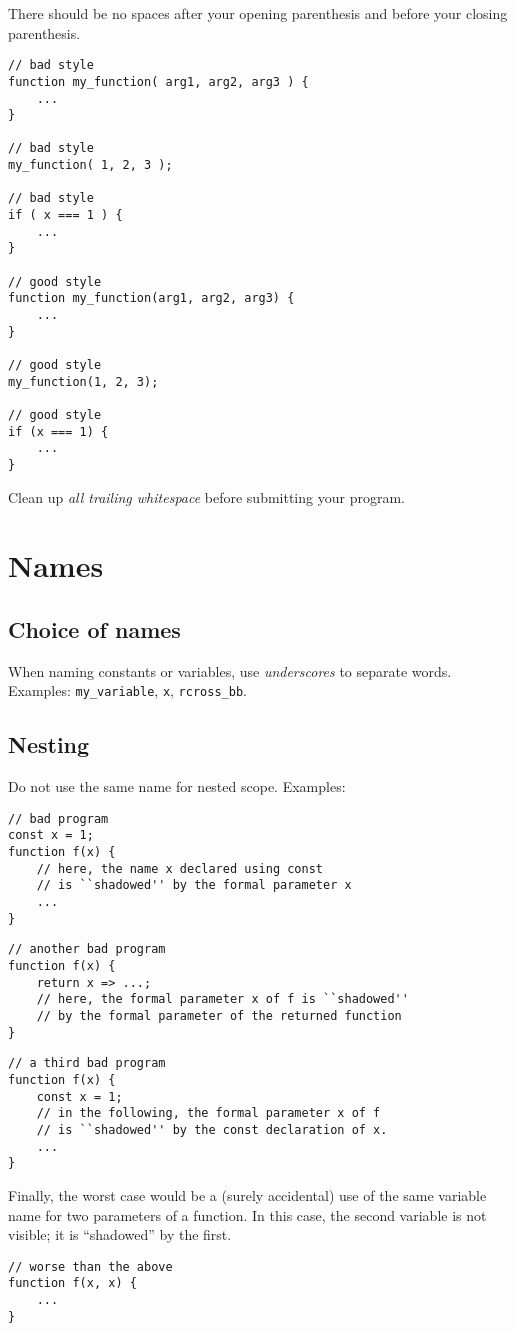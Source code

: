   There should be no spaces after your opening parenthesis and before your closing parenthesis.
  
\begin{lstlisting}
// bad style
function my_function( arg1, arg2, arg3 ) {
    ...
}

// bad style
my_function( 1, 2, 3 );

// bad style
if ( x === 1 ) {
    ...
}

// good style
function my_function(arg1, arg2, arg3) {
    ...
}

// good style
my_function(1, 2, 3);

// good style
if (x === 1) {
    ...
}
\end{lstlisting}

  Clean up \emph{all trailing whitespace} before submitting your program.

\section*{Names}
\subsection*{Choice of names}
When naming constants or variables,
use \emph{underscores} to separate words.
Examples: \lstinline{my_variable}, \lstinline{x}, \lstinline{rcross_bb}.

\subsection*{Nesting}
Do not use the same name for nested scope. Examples:
\begin{lstlisting}
// bad program
const x = 1;
function f(x) {
    // here, the name x declared using const
    // is ``shadowed'' by the formal parameter x
    ...
}
\end{lstlisting}

\begin{lstlisting}
// another bad program
function f(x) {
    return x => ...;
    // here, the formal parameter x of f is ``shadowed'' 
    // by the formal parameter of the returned function
}
\end{lstlisting}

\begin{lstlisting}
// a third bad program
function f(x) {
    const x = 1;
    // in the following, the formal parameter x of f
    // is ``shadowed'' by the const declaration of x.
    ...
}
\end{lstlisting}
Finally, the worst case would be a (surely accidental) 
use of the same variable name for two parameters of a function.
In this case, the second variable is not visible; it is ``shadowed''
by the first.
\begin{lstlisting}
// worse than the above
function f(x, x) {
    ...
}
\end{lstlisting}


